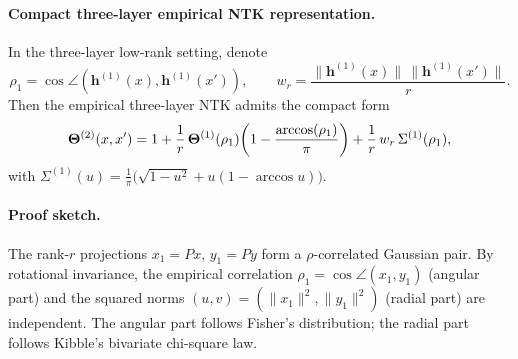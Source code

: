 \begin{remark}
\paragraph{Compact three-layer empirical NTK representation.}
In the three-layer low-rank setting, denote
\[
\rho_1=\cos\angle(\bm{h}^{(1)}(x),\bm{h}^{(1)}(x')),\qquad
w_r=\frac{\|\bm{h}^{(1)}(x)\|\,\|\bm{h}^{(1)}(x')\|}{r}.
\]
Then the empirical three-layer NTK admits the compact form
\[
\boldsymbol{\Theta}^{(2)}(x,x')
=
1
+\frac{1}{r}\,\boldsymbol{\Theta}^{(1)}(\rho_1)\!\left(1-\frac{\arccos(\rho_1)}{\pi}\right)
+\frac{1}{r}\,w_r\,\Sigma^{(1)}(\rho_1),
\]
with \( \Sigma^{(1)}(u)=\frac{1}{\pi}\big(\sqrt{1-u^2}+u(1-\arccos u)\big) \).
\end{remark}

\paragraph{Proof sketch.} The rank-\(r\) projections \(x_1=Px\), \(y_1=Py\) form a \(\rho\)-correlated Gaussian pair. By rotational invariance, the empirical correlation \(\rho_1=\cos\angle(x_1,y_1)\) (angular part) and the squared norms \((u,v)=(\|x_1\|^2,\|y_1\|^2)\) (radial part) are independent. The angular part follows Fisher's distribution; the radial part follows Kibble's bivariate chi-square law.
